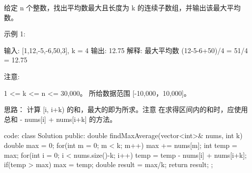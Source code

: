 给定 n 个整数，找出平均数最大且长度为 k 的连续子数组，并输出该最大平均数。

示例 1:

输入: [1,12,-5,-6,50,3], k = 4
输出: 12.75
解释: 最大平均数 (12-5-6+50)/4 = 51/4 = 12.75
 

注意:

1 <= k <= n <= 30,000。
所给数据范围 [-10,000，10,000]。



























思路：
计算 [i, i+k) 的和，最大的即为所求。注意 在求得区间内的和时，应使用 总和 - nums[i] + nums[i+k] 的方法。



























code:
class Solution {
public:
    double findMaxAverage(vector<int>& nums, int k) {
        double max = 0;
        for(int m = 0; m < k; m++)
        {
            max += nums[m];
        }
        int temp = max;
        for(int i = 0; i < nums.size()-k; i++)
        {
            temp = temp - nums[i] + nums[i+k];
            if(temp > max)
                max = temp;
        }
        double result = max/k;
        return result;
    }
};